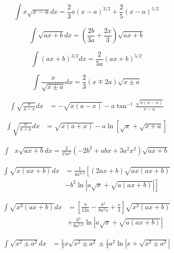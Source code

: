\documentclass[11pt,twoside]{article}
\begin{document}
\begin{multicols}{3}
\begin{footnotesize}
\begin{equation}
\int x\sqrt{x-a} dx = \frac{2}{3}a(x-a)^{3/2}+\frac{2}{5}(x-a)^{5/2}
\end{equation}

\begin{equation}
\int \sqrt{ax+b}dx = \left(\frac{2b}{3a}+\frac{2x}{3}\right)\sqrt{ax+b}
\end{equation}

\begin{equation}
\int (ax+b)^{3/2}dx =\frac{2}{5a}(ax+b)^{5/2}
\end{equation}

\begin{equation}
\int \frac{x}{\sqrt{x\pm a} } dx = \frac{2}{3}(x\mp 2a)\sqrt{x\pm a}
\end{equation}

\begin{align}
\int \sqrt{\frac{x}{a-x}}dx &=  -\sqrt{x(a-x)}
-a\tan^{-1}\frac{\sqrt{x(a-x)}}{x-a}
\end{align}

\begin{align}
\int \sqrt{\frac{x}{a+x}}dx &=  \sqrt{x(a+x)} 
-a\ln \left [ \sqrt{x} + \sqrt{x+a}\right] 
\end{align}

\begin{align}
\int &x \sqrt{ax + b}dx =
\frac{2}{15 a^2}(-2b^2+abx + 3 a^2 x^2)
\sqrt{ax+b}
\end{align}

\begin{align}
\int \sqrt{x(ax+b)} dx &= \frac{1}{4a^{3/2}}\left[(2ax + b)\sqrt{ax(ax+b)} \right. \nonumber
\\& \left.
-b^2 \ln \left| a\sqrt{x} + \sqrt{a(ax+b)} \right| \right ] 
\end{align}

\begin{align}
\int \sqrt{x^3(ax+b)} dx &=\left [ 
\frac{b}{12a}-
\frac{b^2}{8a^2x}+
\frac{x}{3}\right] 
\sqrt{x^3(ax+b)} \nonumber \\& + 
\frac{b^3}{8a^{5/2}}\ln \left | a\sqrt{x} + \sqrt{a(ax+b)} \right |
\end{align}

\begin{align}
\int\sqrt{x^2 \pm a^2} dx &= \frac{1}{2}x\sqrt{x^2\pm a^2} 
\pm\frac{1}{2}a^2 \ln \left | x + \sqrt{x^2\pm a^2} \right | 
\end{align}


\end{footnotesize}
\end{multicols}
\end{document}
